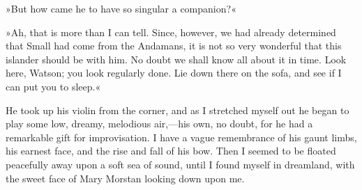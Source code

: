 »But how came he to have so singular a companion?«

»Ah, that is more than I can tell. Since, however, we had already determined that Small had come from the Andamans, it is not so very wonderful that this islander should be with him. No doubt we shall know all about it in time. Look here, Watson; you look regularly done. Lie down there on the sofa, and see if I can put you to sleep.«

He took up his violin from the corner, and as I stretched myself out he began to play some low, dreamy, melodious air,—his own, no doubt, for he had a remarkable gift for improvisation. I have a vague remembrance of his gaunt limbs, his earnest face, and the rise and fall of his bow. Then I seemed to be floated peacefully away upon a soft sea of sound, until I found myself in dreamland, with the sweet face of Mary Morstan looking down upon me.

